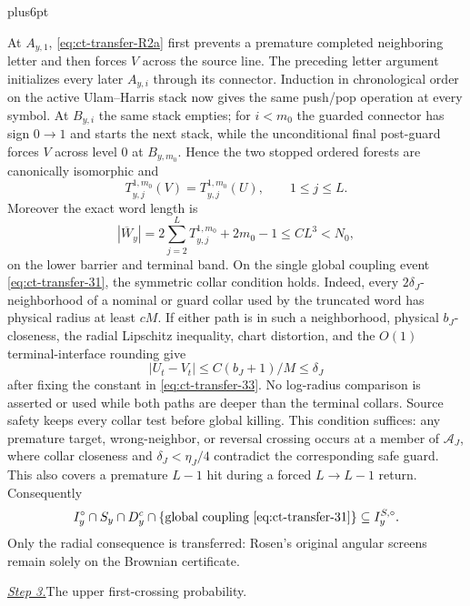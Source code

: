 \documentclass[12pt,reqno]{amsart}
\makeatletter
\theoremstyle{plain}
\theoremstyle{definition}
\theoremstyle{remark}
\renewenvironment{proof}[1][\proofname]{%
  \par
  \pushQED{\qed}%
  \normalfont
  \topsep6pt plus6pt\relax
  \trivlist
  \item[\hskip\labelsep\slshape #1\@addpunct{.}]%
  \ignorespaces
}{%
  \popQED
  \endtrivlist
  \@endpefalse
}
\DeclareRobustCommand{\qed}{%
  \leavevmode\unskip\penalty9999\hbox{}\nobreak
  \ifmmode
    \makebox[0pt][l]{\qquad\hbox{\qedsymbol}}%
  \else
    \qquad\hbox{\qedsymbol}%
  \fi
}
\renewcommand{\qedsymbol}{\rule[.47pt]{4pt}{6pt}}
\numberwithin{equation}{section}
\makeatother
\begin{document}
\begin{proof}[Proof of Lemma~\ref{lem:buffered-transfer}]
At $A_{y,1}$, \eqref{eq:ct-transfer-R2a} first prevents a premature completed neighboring
letter and then forces $V$ across the source line.  The preceding
letter argument initializes every later $A_{y,i}$ through its connector.
Induction in chronological order on the active Ulam--Harris stack now
gives the same push/pop operation at every symbol.  At $B_{y,i}$ the
same stack empties; for $i<m_0$ the guarded connector has sign $0\to1$
and starts the next stack, while the unconditional final post-guard forces
$V$ across level $0$ at $B_{y,m_0}$.  Hence the two stopped ordered
forests are canonically isomorphic and
\begin{equation}
T_{y,j}^{1,m_0}(V)=T_{y,j}^{1,m_0}(U),\qquad1\le j\le L.\label{eq:ct-transfer-R4}
\end{equation}
Moreover the exact word length is
\begin{equation}
|\overline W_y|=2\sum_{j=2}^{L}T_{y,j}^{1,m_0}+2m_0-1
       \le CL^3<N_0,\label{eq:ct-transfer-R4a}
\end{equation}
on the lower barrier and terminal band.  On the single global coupling
event \eqref{eq:ct-transfer-31}, the symmetric collar condition holds.  Indeed, every
$2\delta_J$-neighborhood of a nominal or guard collar used by the
truncated word has physical radius at least $cM$.  If either path is in
such a neighborhood, physical $b_J$-closeness, the radial Lipschitz
inequality, chart distortion, and the $O(1)$ terminal-interface rounding
give
\[
|U_t-V_t|\le C(b_J+1)/M\le\delta_J
\]
after fixing the constant in \eqref{eq:ct-transfer-33}.  No log-radius comparison is asserted or
used while both paths are deeper than the terminal collars.  Source safety
keeps every collar test before global killing.  This condition suffices:
any premature target, wrong-neighbor, or reversal crossing occurs at a
member of $\mathcal A_J$, where collar closeness and
$\delta_J<\eta_J/4$ contradict the corresponding safe guard.  This also
covers a premature $L-1$ hit during a forced $L\to L-1$ return.
Consequently
\begin{equation}
I_y^{\circ}\cap S_y\cap D_y^c\cap\{\text{global coupling \eqref{eq:ct-transfer-31}}\}
       \subseteq I_y^{S,\circ}.\label{eq:ct-transfer-R4b}
\end{equation}
Only the radial consequence is transferred: Rosen's original angular
screens remain solely on the Brownian certificate.

\smallskip\noindent
\underline{\textit{Step 3.}}\quad The upper first-crossing probability.


\end{proof}
\end{document}
